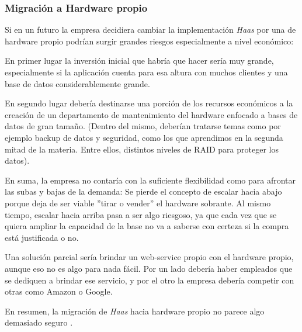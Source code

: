 \subsubsection{Migración a Hardware propio}

Si en un futuro la empresa decidiera cambiar la implementación \emph{Haas} por una de hardware propio podrían surgir 
grandes riesgos especialmente a nivel económico:

En primer lugar la inversión inicial que habría que hacer sería muy grande, especialmente si la aplicación cuenta para
esa altura con muchos clientes y una base de datos considerablemente grande.

En segundo lugar debería destinarse una porción de los recursos económicos a la creación de un departamento de
mantenimiento del hardware enfocado a bases de datos de gran tama\~no. (Dentro del mismo, deberían tratarse temas
como por ejemplo backup de datos y seguridad, como los que aprendimos en la segunda mitad de la materia. Entre
ellos, distintos niveles de RAID para proteger los datos).

En suma, la empresa no contaría con la suficiente flexibilidad como para afrontar las subas y bajas de la demanda:
Se pierde el concepto de escalar hacia abajo porque deja de ser viable ''tirar o vender'' el hardware sobrante.
Al mismo tiempo, escalar hacia arriba pasa a ser algo riesgoso, ya que cada vez que se quiera ampliar la capacidad
de la base no va a saberse con certeza si la compra está justificada o no.

Una solución parcial sería brindar un web-service propio con el hardware propio, aunque eso no es algo para nada fácil.
Por un lado debería haber empleados que se dediquen a brindar ese servicio, y por el otro la empresa debería competir
con otras como Amazon o Google.

En resumen, la migración de \emph{Haas} hacia hardware propio no parece algo demasiado seguro .


